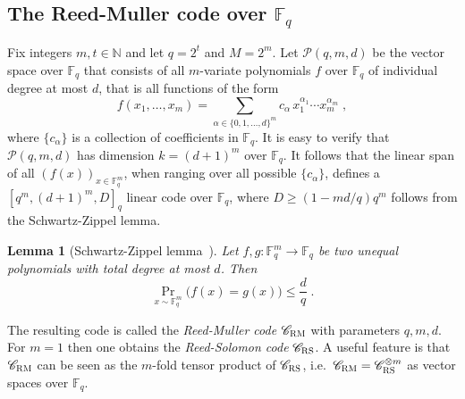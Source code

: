 \documentclass[11pt]{article}
\newtheorem{lemma}[theorem]{Lemma}
\theoremstyle{definition}
\newcommand{\code}{\mathscr{C}}
\newcommand{\N}{\ensuremath{\mathbb{N}}}
\newcommand{\F}{\ensuremath{\mathbb{F}}}
\newcommand{\mP}{\ensuremath{\mathcal{P}}}
\newcommand{\RM}{\ensuremath{\textsc{RM}}}
\newcommand{\RS}{\ensuremath{\textsc{RS}}}
\begin{document}
\subsection{The Reed-Muller code over $\F_q$}
\label{sec:rmq}

Fix integers $m,t \in \N$ and let $q=2^t$ and $M = 2^m$. Let $\mP(q,m,d)$ be the vector space over $\F_q$ that consists of all $m$-variate polynomials $f$ over $\F_q$ of individual degree at most $d$, that is all functions of the form
\[
	f(x_1,\ldots,x_m) = \sum_{\alpha \in \{0,1,\ldots,d\}^m} c_\alpha\,
  x_1^{\alpha_1} \cdots x_m^{\alpha_m}\;,
\]
where $\{c_\alpha\}$ is a collection of coefficients in $\F_q$. It is easy to verify that $\mP(q,m,d)$ has dimension $k = (d+1)^m$ over $\F_q$. It follows that the linear span of all $(f(x))_{x\in \F_q^m}$, when ranging over all possible $\{c_\alpha\}$, defines a $[q^m,(d+1)^m,D]_q$ linear code over $\F_q$, where $D\geq (1-md/q)q^m$ follows from the Schwartz-Zippel lemma.

\begin{lemma}[Schwartz-Zippel lemma~\cite{Sch80,Zip79}]
  \label{lem:schwartz-zippel}
  Let $f, g: \F_q^m \to \F_q$ be two unequal polynomials with total degree at most $d$. Then
  \begin{equation*}
    \Pr_{x \sim \F_q^m}\big(f(x) = g(x)\big) \leq \frac{d}{q}\;.
  \end{equation*}
\end{lemma}

The resulting code is called the \emph{Reed-Muller code} $\code_\RM$ with parameters $q,m,d$. For $m=1$ then one obtains the \emph{Reed-Solomon code} $\code_\RS$. A useful feature is that $\code_\RM$ can be seen as the $m$-fold tensor product of $\code_\RS$, i.e.\ $\code_\RM = \code_\RS^{\otimes m}$ as vector spaces over $\F_q$. 
\end{document}
